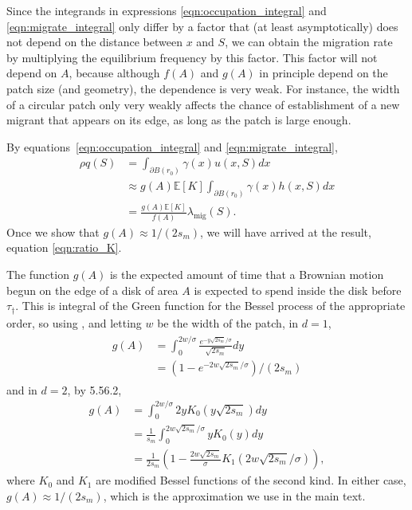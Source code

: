 \documentclass{article}
\newcommand{\citet}[1]{\cite{#1}}
\newcommand{\E}{\mathbb{E}}
\newcommand{\one}{\mathbf{1}}
\newcommand{\migrate}{\lambda_\text{mig}}
\begin{document}
Since the integrands in expressions \eqref{eqn:occupation_integral} and \eqref{eqn:migrate_integral} only differ by a factor
that (at least asymptotically) does not depend on the distance between $x$ and $S$,
we can obtain the migration rate by multiplying the equilibrium frequency by this factor.
This factor will not depend on $A$, 
because although $f(A)$ and $g(A)$ in principle depend on the patch size (and geometry),
the dependence is very weak.
For instance, the width of a circular patch only very weakly affects the chance 
of establishment of a new migrant that appears on its edge,
as long as the patch is large enough.

By equations~\eqref{eqn:occupation_integral} and \eqref{eqn:migrate_integral},
\begin{align}
    \rho q(S)  &= \int_{\partial B(r_0)} \gamma(x) u(x,S) dx  \\
          &\approx g(A) \E[K] \int_{\partial B(r_0)} \gamma(x) h(x,S) dx \\
          &= \frac{ g(A) \E[K] }{ f(A) } \migrate(S) . \label{eqn:q_migrate_relation}
\end{align}
Once we show that $g(A) \approx 1/(2 s_m)$, 
we will have arrived at the result, equation \eqref{eqn:ratio_K}.


The function $g(A)$ is the expected amount of time that a Brownian motion begun on the edge of a disk of area $A$
is expected to spend inside the disk before $\tau_\dagger$.
This is integral of the Green function for the Bessel process of the appropriate order, 
so using \citet{borodin2002handbook}, %
and letting $w$ be the width of the patch,
in $d=1$,
\begin{align} \label{eqn:gA_1D}
  \begin{split}
    g(A) %
      &= \int_0^{2w/\sigma} \frac{ e^{- y \sqrt{2s_m}/\sigma }}{\sqrt{2s_m}} dy \\
      &= (1-e^{-2w\sqrt{2s_m}/\sigma})/(2s_m)
  \end{split}
\end{align}
and in $d=2$, by \citet{gradshteyn2007table} 5.56.2,
\begin{align}
    g(A) %
  &= \int_0^{2w/\sigma} 2 y K_0(y \sqrt{2s_m}) dy \\
  &= \frac{1}{s_m}\int_0^{2w\sqrt{2s_m}/\sigma} y K_0(y) dy \\
  &= \frac{1}{2s_m}\left(1- \frac{2w\sqrt{2s_m}}{\sigma} K_1(2w\sqrt{2s_m}/\sigma) \right)  ,
\end{align}
where $K_0$ and $K_1$ are modified Bessel functions of the second kind.
In either case, $g(A) \approx 1/(2s_m)$, which is the approximation we use in the main text.
\end{document}
